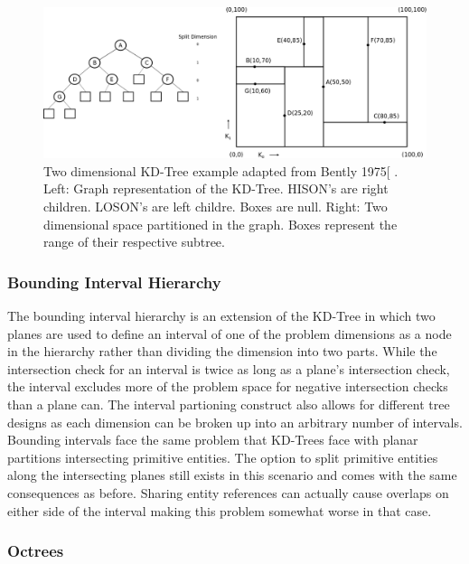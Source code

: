 \documentclass[12pt, a4paper]{article}
\begin{document}

\begin{figure}[H]
  \caption{Two dimensional KD-Tree example adapted from Bently 1975[ \cite{Bently1975}. Left: Graph representation of the KD-Tree. HISON's are right children. LOSON's are left childre. Boxes are null. Right: Two dimensional space partitioned in the graph. Boxes represent the range of their respective subtree.}
  \label{2dkd}
  \includegraphics[scale=0.25]{2d_kd_eg.png}
\end{figure}


\subsubsection{Bounding Interval Hierarchy}%

The bounding interval hierarchy is an extension of the KD-Tree in which two planes are used to define an interval of one of the problem dimensions as a node in the hierarchy rather than dividing the dimension into two parts. While the intersection check for an interval is twice as long as a plane's intersection check, the interval excludes more of the problem space for negative intersection checks than a plane can. The interval partioning construct also allows for different tree designs as each dimension can be broken up into an arbitrary number of intervals. Bounding intervals face the same problem that KD-Trees face with planar partitions intersecting primitive entities. The option to split primitive entities along the intersecting planes still exists in this scenario and comes with the same consequences as before. Sharing entity references can actually cause overlaps on either side of the interval making this problem somewhat worse in that case.


\subsubsection{Octrees}%
\end{document}
